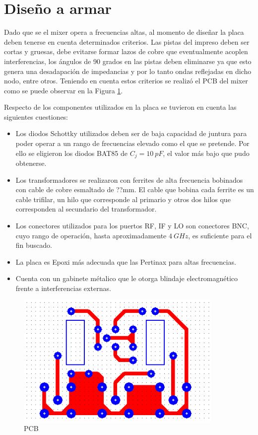 \documentclass[a4paper,10pt]{article}
\begin{document}
	\section{Diseño a armar}
	\indent Dado que se el mixer opera a frecuencias altas, al momento de dise\~nar la placa deben tenerse en cuenta determinados criterios. Las pistas del impreso deben ser cortas y gruesas, debe evitarse formar lazos de cobre que eventualmente acoplen interferencias, los \'angulos de 90 grados en las pistas deben eliminarse ya que esto genera una desadapaci\'on de impedancias y por lo tanto ondas reflejadas en dicho nodo, entre otros. Teniendo en cuenta estos criterios se realiz\'o el PCB del mixer como se puede observar en la Figura \ref{pcb}.
	
	\indent Respecto de los componentes utilizados en la placa se tuvieron en cuenta las siguientes cuestiones:
	\begin{itemize}
	\item Los diodos Schottky utilizados deben ser de baja capacidad de juntura para poder operar a un rango de frecuencias elevado como el que se pretende. Por ello se eligieron los diodos BAT85 de $C_j=10~pF$, el valor m\'as bajo que pudo obtenerse. 
	\item Los transformadores se realizaron con ferrites de alta frecuencia bobinados con cable de cobre esmaltado de ??mm. El cable que bobina cada ferrite es un cable trifilar, un hilo que corresponde al primario y otros dos hilos que corresponden al secundario del transformador.
	\item Los conectores utilizados para los puertos RF, IF y LO son conectores BNC, cuyo rango de operaci\'on, hasta aproximadamente $4~GHz$, es suficiente para el fin buscado.
	\item La placa es Epoxi m\'as adecuada que las Pertinax para altas frecuencias.
	\item Cuenta con un gabinete m\'etalico que le otorga blindaje electromagn\'etico frente a interferencias externas.
	\end{itemize}
	 
	\begin{figure}[!htb]
		\centering
		\includegraphics[width=10cm]{Images/PCB.png}
		\caption{PCB}
		\label{pcb}
	\end{figure}
	
\end{document}
